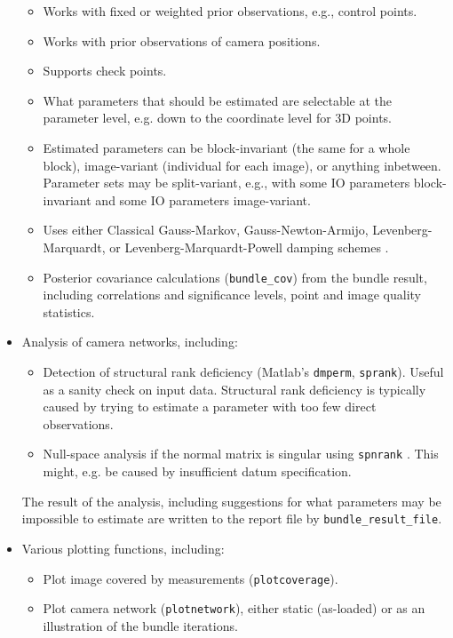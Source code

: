 \documentclass{article}
\begin{document}
\begin{itemize}
\begin{itemize}
  \item Works with fixed or weighted prior observations, e.g., control
    points.
  \item Works with prior observations of camera positions.
  \item Supports check points.
  \item What parameters that should be estimated are selectable at the
    parameter level, e.g. down to the coordinate level for 3D points.
  \item Estimated parameters can be block-invariant (the same for a
    whole block), image-variant (individual for each image), or
    anything inbetween. Parameter sets may be split-variant, e.g.,
    with some IO parameters block-invariant and some IO parameters
    image-variant.
  \item Uses either Classical Gauss-Markov, Gauss-Newton-Armijo,
    Levenberg-Marquardt, or Levenberg-Marquardt-Powell damping schemes
    \citep{Borlin2013:Bundle,Borlin2014:Camera,Borlin2016:External}.
  \item Posterior covariance calculations (\texttt{bundle\_cov}) from
    the bundle result, including correlations and significance levels,
    point and image quality statistics.
  \end{itemize}
\item Analysis of camera networks, including:
  \begin{itemize}
  \item Detection of structural rank deficiency (Matlab's
    \texttt{dmperm}, \texttt{sprank}). Useful as a sanity check on
    input data. Structural rank deficiency is typically caused by
    trying to estimate a parameter with too few direct observations.
  \item Null-space analysis if the normal matrix is singular using
    \texttt{spnrank} \citep{Foster2009:Calculating}. This might, e.g.
    be caused by insufficient datum specification.
  \end{itemize}
  The result of the analysis, including suggestions for what
  parameters may be impossible to estimate are written to the report
  file by \texttt{bundle\_result\_file}.
\item Various plotting functions, including:
  \begin{itemize}
  \item Plot image covered by measurements
    (\texttt{plotcoverage}).
  \item Plot camera network (\texttt{plotnetwork}), either static
    (as-loaded) or as an illustration of the bundle iterations.

\end{itemize}
\end{itemize}
\end{document}

